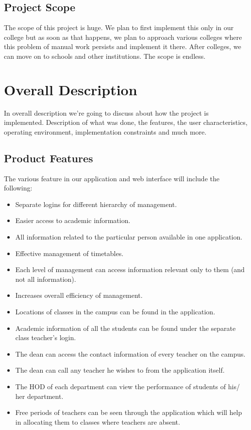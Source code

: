 \documentclass[BTech]{srmuthesis}
\begin{document}
\subsection{Project Scope}
The scope of this project is huge. We plan to first implement this only in our college but as soon as that happens, we plan to approach various colleges where this problem of manual work persists and implement it there. After colleges, we can move on to schools and other institutions. The scope is endless.  
\section{Overall Description}
In overall description we're going to discuss about how the project is implemented. Description of what was done, the features, the user characteristics, operating environment, implementation constraints and much more.
\subsection{Product Features}
The various feature in our application and web interface will include the following:
\begin{itemize}
\item Separate logins for different hierarchy of management.
\item Easier access to academic information.
\item All information related to the particular person available in one application.
\item Effective management of timetables.
\item Each level of management can access information relevant only to them (and not all information).
\item Increases overall efficiency of management.
\item Locations of classes in the campus can be found in the application.
\item Academic information of all the students can be found under the separate class teacher's login.
\item The dean can access the contact information of every teacher on the campus.
\item The dean can call any teacher he wishes to from the application itself.
\item The \ac{HOD} of each department can view the performance of students of his/ her department.
\item Free periods of teachers can be seen through the application which will help in allocating them to classes where teachers are absent.
\end{itemize}
\end{document}
